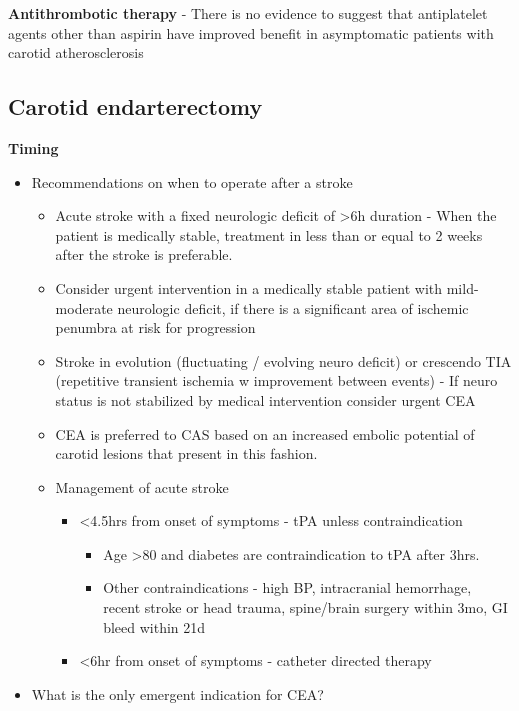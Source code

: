 \documentclass[
]{book}
\begin{document}
\textbf{Antithrombotic therapy} - There is no evidence to suggest that
antiplatelet agents other than aspirin have improved benefit in
asymptomatic patients with carotid atherosclerosis

\hypertarget{carotid-endarterectomy}{%
\subsection{\texorpdfstring{\textbf{Carotid endarterectomy}}{Carotid endarterectomy}}\label{carotid-endarterectomy}}

\textbf{Timing}

\begin{itemize}
\item
  Recommendations on when to operate after a stroke

  \begin{itemize}
  \item
    Acute stroke with a fixed neurologic deficit of \textgreater6h duration -
    When the patient is medically stable, treatment in less than or
    equal to 2 weeks after the stroke is preferable.
    \citep{rothwellEndarterectomySymptomaticCarotid2004, meershoekTimingCarotidIntervention2018}
  \item
    Consider urgent intervention in a medically stable patient with
    mild-moderate neurologic deficit, if there is a significant area
    of ischemic penumbra at risk for progression
  \item
    Stroke in evolution (fluctuating / evolving neuro deficit) or
    crescendo TIA (repetitive transient ischemia w improvement
    between events) - If neuro status is not stabilized by medical
    intervention consider urgent CEA
  \item
    CEA is preferred to CAS based on an increased embolic potential
    of carotid lesions that present in this fashion.
    \citep{rantnerEarlyEndarterectomyCarries2017}
  \item
    Management of acute stroke \citep{powers2018GuidelinesEarly2018}

    \begin{itemize}
    \item
      \textless4.5hrs from onset of symptoms - tPA unless
      contraindication

      \begin{itemize}
      \item
        Age \textgreater80 and diabetes are contraindication to tPA after
        3hrs.
      \item
        Other contraindications - high BP, intracranial
        hemorrhage, recent stroke or head trauma, spine/brain
        surgery within 3mo, GI bleed within 21d
      \end{itemize}
    \item
      \textless6hr from onset of symptoms - catheter directed therapy
    \end{itemize}
  \end{itemize}
\item
  What is the only emergent indication for CEA?


\end{itemize}
\end{document}
